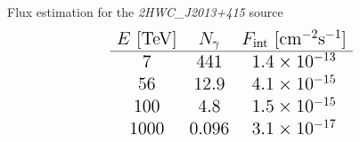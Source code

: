 \begin{frame}{Flux estimation for the \textit{2HWC\_J2013+415} source}
\[
\Large
\begin{array}{ccc}
E~[\mathrm{TeV}] & N_\gamma & F_\mathrm{int}~[\mathrm{cm}^{-2}\mathrm{s}^{-1}] \\\hline
7 & 441 & 1.4\times10^{-13}\\
56 & 12.9 & 4.1\times10^{-15}\\
100 & 4.8 & 1.5\times10^{-15}\\
1000 & 0.096 & 3.1\times10^{-17}\\
\end{array}
\]
\end{frame}
